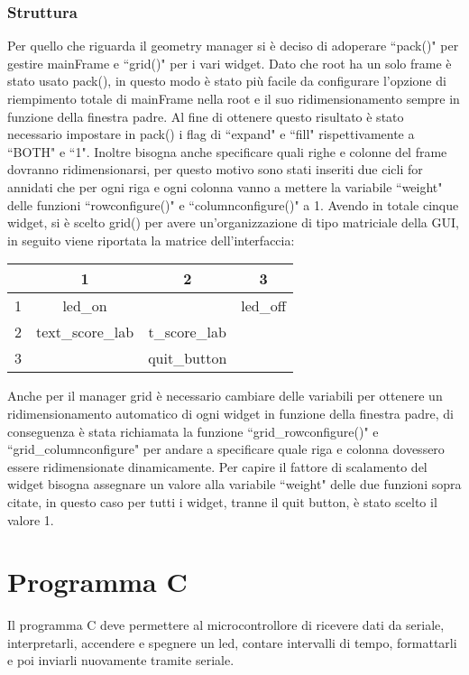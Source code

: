 \documentclass[a4paper]{article}
\begin{document}
\subsubsection{Struttura}
Per quello che riguarda il geometry manager si è deciso di adoperare ``pack()" per gestire mainFrame e ``grid()" per i vari widget. Dato che root ha un solo frame è stato usato pack(), in questo modo è stato più facile da configurare l'opzione di riempimento totale di mainFrame nella root e il suo ridimensionamento sempre in funzione della finestra padre. Al fine di ottenere questo risultato è stato necessario impostare in pack() i flag di ``expand" e ``fill" rispettivamente a ``BOTH" e ``1". Inoltre bisogna anche specificare quali righe e colonne del frame dovranno ridimensionarsi, per questo motivo sono stati inseriti due cicli for annidati che per ogni riga e ogni colonna vanno a mettere la variabile ``weight" delle funzioni ``rowconfigure()" e ``columnconfigure()" a 1. \newline
Avendo in totale cinque widget, si è scelto grid() per avere un'organizzazione di tipo matriciale della GUI, in seguito viene riportata la matrice dell'interfaccia:
\begin{table}[H]
	
	\renewcommand{\arraystretch}{3}
	
	\centering
	\begin{tabular}{l|c|c|c}
	     & 1 & 2 & 3 \\ \hline
		1  \qquad \qquad  &led\_on & \qquad & led\_off  \qquad \qquad \\ \hline
		2 & text\_score\_lab & t\_score\_lab & \qquad \\ \hline
		3 & \qquad & quit\_button & \qquad
	\end{tabular}
\end{table}
\noindent
Anche per il manager grid è necessario cambiare delle variabili per ottenere un ridimensionamento automatico di ogni widget in funzione della finestra padre, di conseguenza è stata richiamata la funzione ``grid\_rowconfigure()" e ``grid\_columnconfigure" per andare a specificare quale riga e colonna dovessero essere ridimensionate dinamicamente. Per capire il fattore di scalamento del widget bisogna assegnare un valore alla variabile  ``weight" delle due funzioni sopra citate, in questo caso per tutti i widget, tranne il quit button, è stato scelto il valore 1.

\section{Programma C}
Il programma C deve permettere al microcontrollore di ricevere dati da seriale, interpretarli, accendere e spegnere un led, contare intervalli di tempo, formattarli e poi inviarli nuovamente tramite seriale.
\end{document}

